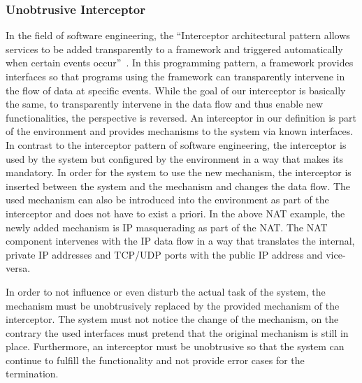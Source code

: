 \subsubsection{Unobtrusive Interceptor}
In the field of software engineering, the ``Interceptor architectural pattern allows services to be added transparently to a framework and triggered automatically when certain events occur''~\cite{schmidt2013pattern}.
In this programming pattern, a framework provides interfaces so that programs using the framework can transparently intervene in the flow of data at specific events.
While the goal of our interceptor is basically the same, to transparently intervene in the data flow and thus enable new functionalities, the perspective is reversed.
An interceptor in our definition is part of the environment and provides mechanisms to the system via known interfaces. 
In contrast to the interceptor pattern of software engineering, the interceptor is used by the system but configured by the environment in a way that makes its mandatory.
In order for the system to use the new mechanism, the interceptor is inserted between the system and the mechanism and changes the data flow.
The used mechanism can also be introduced into the environment as part of the interceptor and does not have to exist a priori.
In the above NAT example, the newly added mechanism is IP masquerading as part of the NAT.
The NAT component intervenes with the IP data flow in a way that translates the internal, private IP addresses and TCP/UDP ports with the public IP address and vice-versa.

In order to not influence or even disturb the actual task of the system, the mechanism must be unobtrusively replaced by the provided mechanism of the interceptor.
The system must not notice the change of the mechanism, on the contrary the used interfaces must pretend that the original mechanism is still in place.
Furthermore, an interceptor must be unobtrusive so that the system can continue to fulfill the functionality and not provide error cases for the termination.
